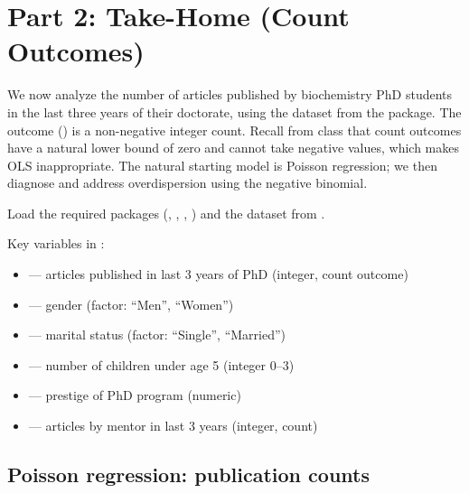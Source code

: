 \section{Part 2: Take-Home (Count Outcomes)}

We now analyze the number of articles published by biochemistry PhD students in the last three years of their doctorate, using the  dataset from the  package. The outcome () is a non-negative integer count. Recall from class that count outcomes have a natural lower bound of zero and cannot take negative values, which makes OLS inappropriate. The natural starting model is Poisson regression; we then diagnose and address overdispersion using the negative binomial.

Load the required packages (, , , ) and the  dataset from .

Key variables in :
\begin{itemize}
  \item {} --- articles published in last 3 years of PhD (integer, count outcome)
  \item {} --- gender (factor: ``Men'', ``Women'')
  \item {} --- marital status (factor: ``Single'', ``Married'')
  \item {} --- number of children under age 5 (integer 0--3)
  \item {} --- prestige of PhD program (numeric)
  \item {} --- articles by mentor in last 3 years (integer, count)
\end{itemize}

\subsection{Poisson regression: publication counts}

